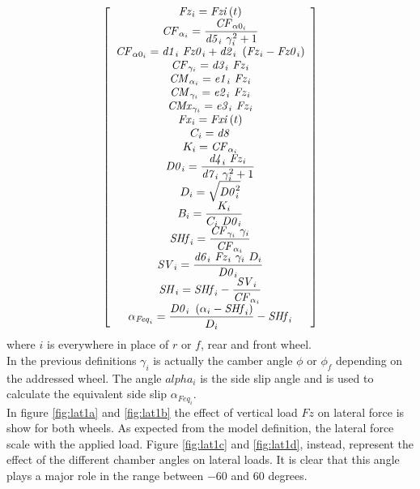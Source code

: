 \begin{equation}
    \left[ \begin {array}{c} {\it Fz}_{i} ={\it Fzi} \left(t \right)
    \\ \displaystyle {\it CF}_{\alpha_{i}} =\frac{{\it CF}_{\alpha0_{i
    }} }{{\it d5}_{i} ~\gamma_{i} ^{2}+1}\\ {\it CF}_{
    \alpha0_{i}} ={\it d1}_{i} ~{\it Fz0}_{i} +{\it d2}_{i} ~\left({\it Fz
    }_{i} -{\it Fz0}_{i} \right)\\ {\it CF}_{\gamma_{i}}
     ={\it d3}_{i} ~{\it Fz}_{i} \\ {\it CM}_{\alpha_{i}
    } ={\it e1}_{i} ~{\it Fz}_{i} \\ {\it CM}_{\gamma_{i
    }} ={\it e2}_{i} ~{\it Fz}_{i} \\ {\it CMx}_{\gamma_
    {i}} ={\it e3}_{i} ~{\it Fz}_{i} \\ {\it Fx}_{i} ={
    \it Fxi} \left(t \right)\\ C_{i} ={\it d8} 
    \\ K_{i} ={\it CF}_{\alpha_{i}} 
    \\ \displaystyle {\it D0}_{i} =\frac{{\it d4}_{i} ~{\it Fz}_{i} }{
    {\it d7}_{i} ~\gamma_{i} ^{2}+1}\\ D_{i} =\sqrt{{
    \it D0}_{i} ^{2}}\\ \displaystyle B_{i} =\frac{K_{i} }{C_{i} ~{
    \it D0}_{i} }\\ \displaystyle {\it SHf}_{i} =\frac{{\it CF}_{
    \gamma_{i}} ~\gamma_{i} }{{\it CF}_{\alpha_{i}} }\\ 
    \displaystyle {\it SV}_{i} =\frac{{\it d6}_{i} ~{\it Fz}_{i} ~\gamma_{i} ~D_{i} }{{
    \it D0}_{i} }\\ \displaystyle {\it SH}_{i} ={\it SHf}_{i} -\frac{{
    \it SV}_{i} }{{\it CF}_{\alpha_{i}} }\\ \displaystyle \alpha_{{
    \it Feq}_{i}} =\frac{{\it D0}_{i} ~\left(\alpha_{i} -{\it SHf}_{i} 
    \right)}{D_{i} }-{\it SHf}_{i} \end {array} \right]    
\end{equation}
%
where $i$ is everywhere in place of $r$ or $f$, rear and front wheel.\\
In the previous definitions $\gamma_i$ is actually the camber angle $\phi$ or $\phi_f$ depending on the addressed wheel. The angle $alpha_i$ is the side slip angle and is used to calculate the equivalent side slip $\alpha_{Feq_i}$.\\
In figure \ref{fig:lat1a} and \ref{fig:lat1b} the effect of vertical load $Fz$ on lateral force is show for both wheels. As expected from the model definition, the lateral force scale with the applied load. Figure \ref{fig:lat1c} and \ref{fig:lat1d}, instead, represent the effect of the different chamber angles on lateral loads. It is clear that this angle plays a major role in the range between $-60$ and $60$ degrees. 
%
